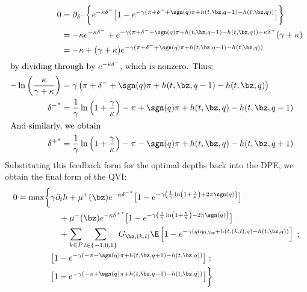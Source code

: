 \documentclass[12pt]{article}
\begin{document}
\begin{subequations}
\begin{align}
\label{eq:optdepthfeedbackcase2}
0 & = \partial_{\delta^-}\biggl\lbrace e^{ -\kappa \delta^{-}} \bigl[ 1 - e^{-\gamma(\pi + \delta^- + \sgn(q)\pi + h(t,\bz,q-1) - h(t,\bz,q))} \bigr] \biggr\rbrace \nonumber \\
& = -\kappa e^{ -\kappa \delta^{-}} + e^{-\gamma(\pi + \delta^- + \sgn(q)\pi + h(t,\bz,q-1) - h(t,\bz,q)) -\kappa \delta^-} (\gamma + \kappa) \nonumber \\
& = -\kappa + ( \gamma + \kappa ) e^{-\gamma(\pi + \delta^- + \sgn(q)\pi + h(t,\bz,q-1) - h(t,\bz,q))} \nonumber \\
\intertext{by dividing through by $e^{-\kappa \delta^-}$, which is nonzero. Thus:}
-\ln\left( \frac{\kappa}{\gamma + \kappa} \right) & = \gamma \left( \pi + \delta^- + \sgn(q)\pi + h(t,\bz,q-1) - h(t,\bz,q) \right) \nonumber \\
{\delta^-}^* & = \frac{1}{\gamma} \ln \left( 1 + \frac{\gamma}{\kappa}\right) - \pi + \sgn(q)\pi + h(t,\bz,q) - h(t,\bz,q-1) \\
\intertext{And similarly, we obtain}
{\delta^+}^* & = \frac{1}{\gamma} \ln \left( 1 + \frac{\gamma}{\kappa}\right) - \pi - \sgn(q)\pi + h(t,\bz,q) - h(t,\bz,q+1)
\end{align}
\end{subequations}
Substituting this feedback form for the optimal depths back into the DPE, we obtain the final form of the QVI:
\begin{equation}
\label{eq:PDEcase2}
\begin{split}
0 = \max \biggl\lbrace & \gamma \partial_t h + \mu^+(\bz) e^{ -\kappa{\delta^-}^*} \bigl[ 1 - e^{-\gamma\left(\frac{1}{\gamma} \ln \left( 1 + \frac{\gamma}{\kappa}\right) + 2\pi \sgn(q)\right)} \bigr] \\
& \quad + \mu^-(\bz) e^{ -\kappa {\delta^+}^*} \bigl[ 1 - e^{-\gamma \left( \frac{1}{\gamma} \ln \left( 1 + \frac{\gamma}{\kappa}\right) - 2\pi \sgn(q) \right)} \bigr] \\
& \quad + \sum_{k\in P} \sum_{l \in \{-1,0,1\}} G_{\bz,(k,l)} \E \left[ 1 - e^{-\gamma(ql\eta_{0,\bz} + h(t,(k,l),q) - h(t,\bz,q))} \right] \; ; \\
& \bigl[ 1- e^{-\gamma(-\pi - \sgn(q)\pi + h(t,\bz,q+1) - h(t,\bz,q)) } \bigr] \; ; \\
& \bigl[ 1- e^{-\gamma(-\pi + \sgn(q)\pi + h(t,\bz,q-1) - h(t,\bz,q)) } \bigr] \biggr\rbrace
\end{split}
\end{equation}
\end{document}
